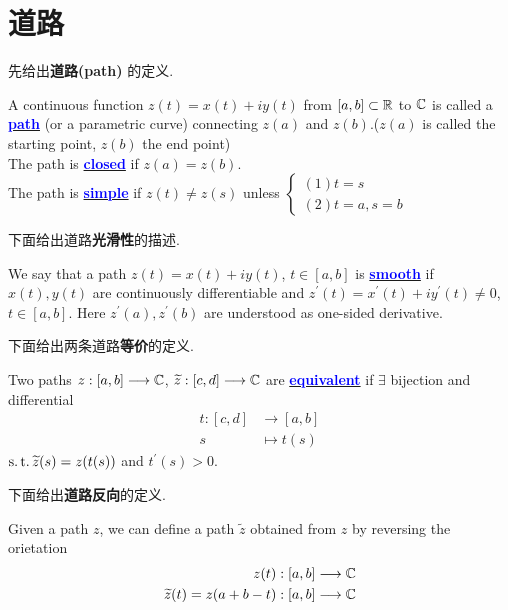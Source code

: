 \section{道路}
先给出\textbf{道路(path)} 的定义.
\begin{defn}\label{def 3.4.1}
	A continuous function $z(t) = x(t) + i y(t)$ from $[a , b] \subset \mathbb{R}$ to $\mathbb{C}$ is called a \underline{\textcolor{blue}{\textbf{path}}} (or a parametric curve) connecting $z(a)$ and $z(b)$.($z(a)$ is called the starting point, $z(b)$ the end point)\\
	The path is \underline{\textcolor{blue}{\textbf{closed}}} if $z(a) = z(b)$.\\
	The path is \underline{\textcolor{blue}{\textbf{simple}}} if $z(t) \neq z(s)$ unless 
	$\begin{cases}
		(1) t = s\\
		(2) t = a , s = b
	\end{cases}$
\end{defn}

\vspace{2em}
下面给出道路\textbf{光滑性}的描述.
\begin{defn}\label{def 3.4.2}
	We say that a path $z(t) = x(t) + i y(t)$, $t \in [a , b]$ is \underline{\textcolor{blue}{\textbf{smooth}}} if $x(t) , y(t)$ are continuously differentiable and $z^{'}(t) = x^{'}(t) + i y^{'}(t) \neq 0$, $t \in [a , b]$. Here $z^{'}(a) , z^{'}(b)$ are understood as one-sided derivative.
\end{defn}

\vspace{2em}
下面给出两条道路\textbf{等价}的定义.
\begin{defn}
	Two paths $z : [a , b] \longrightarrow \mathbb{C}$, $\widetilde{z} : [c, d] \longrightarrow \mathbb{C}$ are \underline{\textcolor{blue}{\textbf{equivalent}}} if $\exists$ bijection and differential
	\begin{align}
		t : [c , d] &\longrightarrow [a , b] \\
		s &\longmapsto t(s)
	\end{align}
	$\operatorname{s.t.} \widetilde{z}(s) = z(t(s))$ and $t^{'}(s) > 0$.
\end{defn}

\vspace{2em}
下面给出\textbf{道路反向}的定义.
\begin{defn}\label{def 3.4.4}
	Given a path $z$, we can define a path $\widetilde{z}$ obtained from $z$ by reversing the orietation
	\begin{align}
		z(t) &: [a , b] \longrightarrow \mathbb{C} \\
		\widetilde{z}(t) = z(a + b - t) &: [a , b] \longrightarrow \mathbb{C}
	\end{align}
\end{defn}


